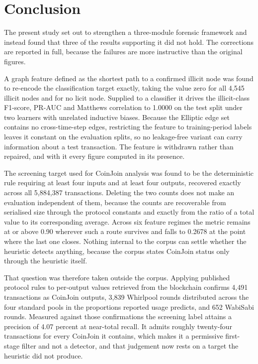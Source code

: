 \documentclass[12pt,a4paper]{article}
\begin{document}
\section{Conclusion}
\label{sec:conclude}

The present study set out to strengthen a three-module forensic
framework and instead found that three of the results supporting
it did not hold. The corrections are reported in full, because
the failures are more instructive than the original figures.

A graph feature defined as the shortest path to a confirmed
illicit node was found to re-encode the classification target
exactly, taking the value zero for all 4{,}545 illicit nodes and
for no licit node. Supplied to a classifier it drives the
illicit-class F1-score, PR-AUC and Matthews correlation to 1.0000
on the test split under two learners with unrelated inductive
biases. Because the Elliptic edge set contains no cross-time-step
edges, restricting the feature to training-period labels leaves
it constant on the evaluation splits, so no leakage-free variant
can carry information about a test transaction. The feature is
withdrawn rather than repaired, and with it every figure computed
in its presence.

The screening target used for CoinJoin analysis was found to be
the deterministic rule requiring at least four inputs and at
least four outputs, recovered exactly across all 5{,}884{,}387
transactions. Deleting the two counts does not make an evaluation
independent of them, because the counts are recoverable from
serialised size through the protocol constants and exactly from
the ratio of a total value to its corresponding average. Across
six feature regimes the metric remains at or above 0.90 wherever
such a route survives and falls to 0.2678 at the point where the
last one closes. Nothing internal to the corpus can settle
whether the heuristic detects anything, because the corpus states
CoinJoin status only through the heuristic itself.

That question was therefore taken outside the corpus. Applying
published protocol rules to per-output values retrieved from the
blockchain confirms 4{,}491 transactions as CoinJoin outputs,
3{,}839 Whirlpool rounds distributed across the four standard
pools in the proportions reported usage predicts, and 652
WabiSabi rounds. Measured against those confirmations the
screening label attains a precision of 4.07 percent at near-total
recall. It admits roughly twenty-four transactions for every
CoinJoin it contains, which makes it a permissive first-stage
filter and not a detector, and that judgement now rests on a
target the heuristic did not produce.
\end{document}
